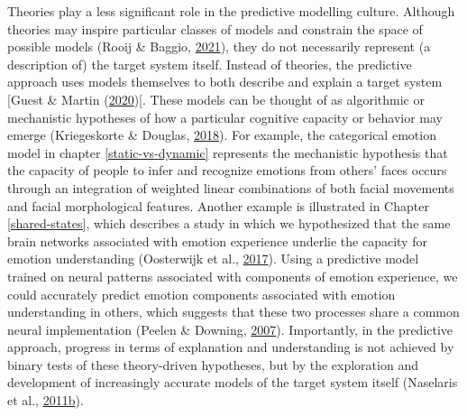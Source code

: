 \documentclass[11pt,american,a4paper,oneside,]{memoir} %
\begin{document}
Theories play a less significant role in the predictive modelling culture. Although theories may inspire particular classes of models and constrain the space of possible models (Rooij \& Baggio, \protect\hyperlink{ref-Van_Rooij2021-bk}{2021}), they do not necessarily represent (a description of) the target system itself. Instead of theories, the predictive approach uses models themselves to both describe and explain a target system {[}Guest \& Martin (\protect\hyperlink{ref-Guest2020-ef}{2020}){[}. These models can be thought of as algorithmic or mechanistic hypotheses of how a particular cognitive capacity or behavior may emerge (Kriegeskorte \& Douglas, \protect\hyperlink{ref-Kriegeskorte2018-om}{2018}). For example, the categorical emotion model in chapter \ref{static-vs-dynamic} represents the mechanistic hypothesis that the capacity of people to infer and recognize emotions from others' faces occurs through an integration of weighted linear combinations of both facial movements and facial morphological features. Another example is illustrated in Chapter \ref{shared-states}, which describes a study in which we hypothesized that the same brain networks associated with emotion experience underlie the capacity for emotion understanding (Oosterwijk et al., \protect\hyperlink{ref-Oosterwijk2017-sc}{2017}). Using a predictive model trained on neural patterns associated with components of emotion experience, we could accurately predict emotion components associated with emotion understanding in others, which suggests that these two processes share a common neural implementation (Peelen \& Downing, \protect\hyperlink{ref-Peelen2007-ew}{2007}). Importantly, in the predictive approach, progress in terms of explanation and understanding is not achieved by binary tests of these theory-driven hypotheses, but by the exploration and development of increasingly accurate models of the target system itself (Naselaris et al., \protect\hyperlink{ref-Naselaris2011-oh}{2011}\protect\hyperlink{ref-Naselaris2011-oh}{b}).
\end{document}
